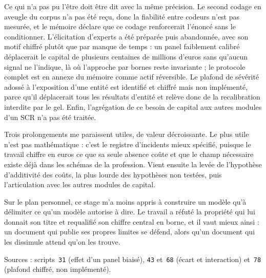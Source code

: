 \documentclass[12pt,a4paper]{article}
\theoremstyle{definition}
\begin{document}
Ce qui n'a pas pu l'être doit être dit avec la même précision. Le second codage en
aveugle du corpus n'a pas été reçu, donc la fiabilité entre codeurs n'est pas
mesurée, et le mémoire déclare que ce codage renforcerait l'énoncé sans le
conditionner. L'élicitation d'experts a été préparée puis abandonnée, avec son
motif chiffré plutôt que par manque de temps : un panel faiblement calibré
déplacerait le capital de plusieurs centaines de millions d'euros sans qu'aucun
signal ne l'indique, là où l'approche par bornes reste invariante ; le protocole
complet est en annexe du mémoire comme actif réversible. Le plafond de sévérité
adossé à l'exposition d'une entité est identifié et chiffré mais non implémenté,
parce qu'il déplacerait tous les résultats d'entité et relève donc de la
recalibration interdite par le gel. Enfin, l'agrégation de ce besoin de capital aux
autres modules d'un SCR n'a pas été traitée.

Trois prolongements me paraissent utiles, de valeur décroissante. Le plus utile
n'est pas mathématique : c'est le registre d'incidents mieux spécifié, puisque le
travail chiffre en euros ce que sa seule absence coûte et que le champ nécessaire
existe déjà dans les schémas de la profession. Vient ensuite la levée de
l'hypothèse d'additivité des coûts, la plus lourde des hypothèses non testées,
puis l'articulation avec les autres modules de capital.

Sur le plan personnel, ce stage m'a moins appris à construire un modèle qu'à
délimiter ce qu'un modèle autorise à dire. Le travail a réfuté la propriété qui lui
donnait son titre et requalifié son chiffre central en borne, et il vaut mieux
ainsi : un document qui publie ses propres limites se défend, alors qu'un document
qui les dissimule attend qu'on les trouve.

\vspace{4pt}
\noindent Sources : scripts~\texttt{31} (effet d'un panel biaisé), \texttt{43}
et~\texttt{68} (écart et interaction) et~\texttt{78} (plafond chiffré, non
implémenté).

\begin{singlespace}


\end{singlespace}

\appendix
\newpage
\end{document}
